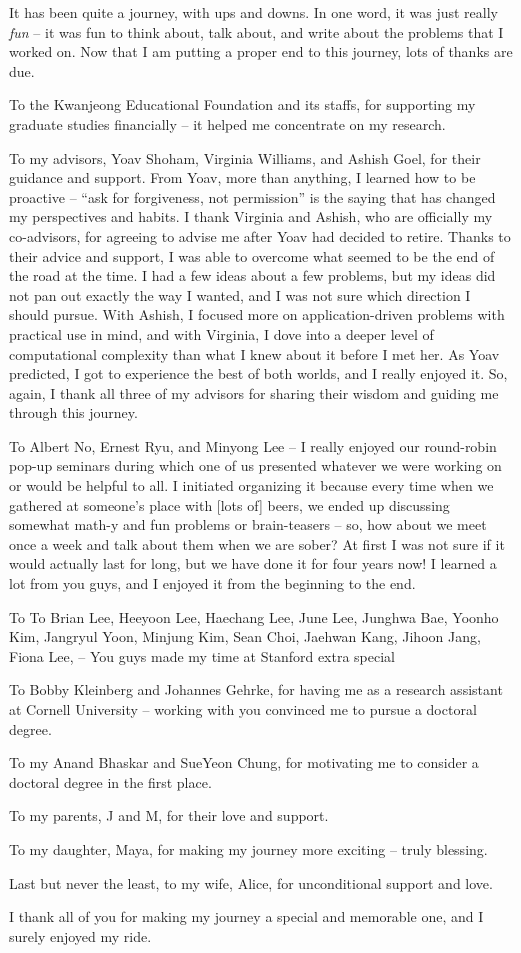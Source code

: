 It has been quite a journey, with ups and downs.
In one word, it was just really {\em fun} -- it was fun to think about, talk about, and write about the problems that I worked on. 
Now that I am putting a proper end to this journey, lots of thanks are due. 

To the Kwanjeong Educational Foundation and its staffs, for supporting my graduate studies financially -- it helped me concentrate on my research.

To my advisors, Yoav Shoham, Virginia Williams, and Ashish Goel, for their guidance and support. From Yoav, more than anything, I learned how to be proactive -- ``ask for forgiveness, not permission'' is the saying that has changed my perspectives and habits. I thank Virginia and Ashish, who are officially my co-advisors, for agreeing to advise me after Yoav had decided to retire. Thanks to their advice and support, I was able to overcome what seemed to be the end of the road at the time. I had a few ideas about a few problems, but my ideas did not pan out exactly the way I wanted, and I was not sure which direction I should pursue. With Ashish, I focused more on application-driven problems with practical use in mind, and with Virginia, I dove into a deeper level of computational complexity than what I knew about it before I met her. As Yoav predicted, I got to experience the best of both worlds, and I really enjoyed it. So, again, I thank all three of my advisors for sharing their wisdom and guiding me through this journey.

To Albert No, Ernest Ryu, and Minyong Lee -- I really enjoyed our round-robin pop-up seminars during which one of us presented whatever we were working on or would be helpful to all. I initiated organizing it because every time when we gathered at someone's place with [lots of] beers, we ended up discussing somewhat math-y and fun problems or brain-teasers -- so, how about we meet once a week and talk about them when we are sober? At first I was not sure if it would actually last for long, but we have done it for four years now! I learned a lot from you guys, and I enjoyed it from the beginning to the end. 

To 
To Brian Lee, Heeyoon Lee, Haechang Lee, June Lee, Junghwa Bae, Yoonho Kim, Jangryul Yoon, Minjung Kim, Sean Choi, Jaehwan Kang, Jihoon Jang, Fiona Lee,  -- You guys made my time at Stanford extra special  


To Bobby Kleinberg and Johannes Gehrke, for having me as a research assistant at Cornell University -- working with you convinced me to pursue a doctoral degree.

To my Anand Bhaskar and SueYeon Chung, for motivating me to consider a doctoral degree in the first place.

To my parents, J and M, for their love and support.

To my daughter, Maya, for making my journey more exciting -- truly blessing.

Last but never the least, to my wife, Alice, for unconditional support and love.

I thank all of you for making my journey a special and memorable one, and I surely enjoyed my ride.


